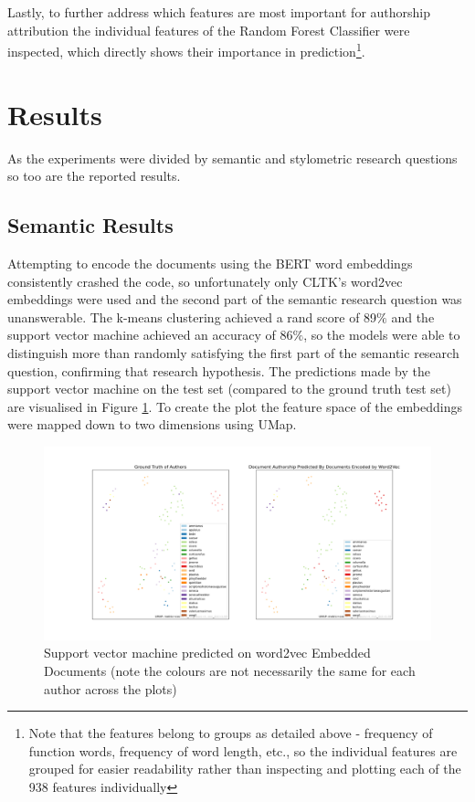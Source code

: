 \documentclass{csfourzero}
\begin{document}
 Lastly, to further address which features are most important for authorship attribution the individual features of the Random Forest Classifier were inspected, which directly shows their importance in prediction\footnote{Note that the features belong to groups as detailed above - frequency of function words, frequency of word length, etc., so the individual features are grouped for easier readability rather than inspecting and plotting each of the 938 features individually}. 
\section{Results}
\label{sec:results}
As the experiments were divided by semantic and stylometric research questions so too are the reported results.
\subsection{Semantic Results}
Attempting to encode the documents using the BERT word embeddings consistently crashed the code, so unfortunately only CLTK’s word2vec embeddings were used and the second part of the semantic research question was unanswerable. The k-means clustering achieved a rand score of 89$\%$ and the support vector machine achieved an accuracy of 86$\%$, so the models were able to distinguish more than randomly satisfying the first part of the semantic research question, confirming that research hypothesis. The predictions made by the support vector machine on the test set (compared to the ground truth test set) are visualised in Figure \ref{fig:SVM_UMAP}. To create the plot the feature space of the embeddings were mapped down to two dimensions using UMap.
\begin{figure}[hbt!]
    \centering
    \includegraphics[width=6in]{SVM Documents Predicted on Word 2 Vec.png}
    \caption{Support vector machine predicted on word2vec Embedded Documents (note the colours are not necessarily the same for each author across the plots)}
    \label{fig:SVM_UMAP}
\end{figure}
\end{document}
